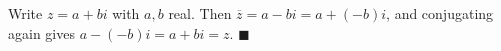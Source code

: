 Write $z=a+bi$ with $a,b$ real. Then $\overline z=a-bi=a+(-b)i$, and conjugating again gives $a-(-b)i=a+bi=z$. $\blacksquare$
